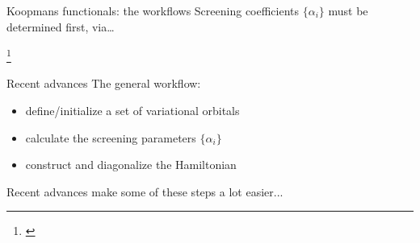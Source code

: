 \documentclass[xcolor=table,aspectratio=169]{beamer}
\newcommand\blfootcite[1]{%
  \begingroup
  \renewcommand\thefootnote{}\footnote{\hspace{-4ex}\cite{#1}}%
  \addtocounter{footnote}{-1}%
  \endgroup
}
\numberwithin{equation}{section}
\begin{document}
\begin{frame}{Koopmans functionals: the workflows}
   \small Screening coefficients $\{\alpha_i\}$ must be determined first, via\dots

   \vspace{1ex}


   \vspace{-1.5ex}

    \blfootcite{DeGennaro2022,Colonna2022,Schubert2022}


\end{frame}

\begin{frame}{Recent advances}
   The general workflow:
   \begin{itemize}
      \item define/initialize a set of variational orbitals
      \item calculate the screening parameters $\{\alpha_i\}$
      \item construct and diagonalize the Hamiltonian
   \end{itemize}

   Recent advances make some of these steps a lot easier...
\end{frame}
\end{document}
